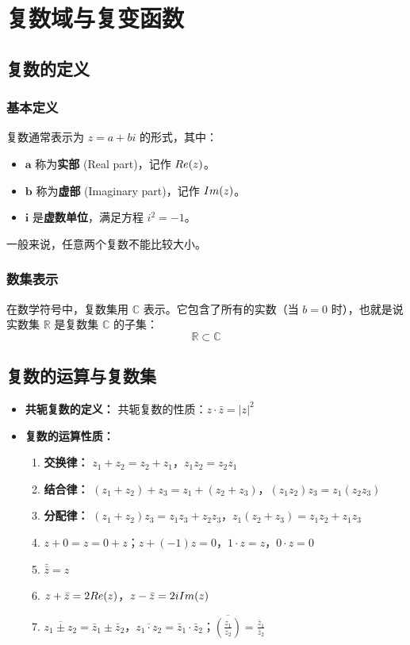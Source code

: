 \chapter{复数域与复变函数}

\section{复数的定义}
\subsection{基本定义}
复数通常表示为 $z = a + bi$ 的形式，其中：
\begin{itemize}
	\item $\boldsymbol{a}$ 称为\textbf{实部} (Real part)，记作 $Re(z)$。
	\item $\boldsymbol{b}$ 称为\textbf{虚部} (Imaginary part)，记作 $Im(z)$。
	\item $\boldsymbol{i}$ 是\textbf{虚数单位}，满足方程 $i^2 = -1$。
\end{itemize}

\begin{tcolorbox}[title=备注 (Remark), colframe=lightgray!60!black, colback=lightgray!10!white, sharp corners]
	一般来说，任意两个复数不能比较大小。
\end{tcolorbox}

\subsection{数集表示}
在数学符号中，复数集用 $\mathbb{C}$ 表示。它包含了所有的实数（当 $b=0$ 时），也就是说实数集 $\mathbb{R}$ 是复数集 $\mathbb{C}$ 的子集：
$$\mathbb{R} \subset \mathbb{C}$$

\section{复数的运算与复数集}
\begin{itemize}
	\item \textbf{共轭复数的定义：}
	共轭复数的性质：$z \cdot \bar{z} = |z|^2$
	\item \textbf{复数的运算性质：}
	\begin{enumerate}
		\item \textbf{交换律：} $z_1 + z_2 = z_2 + z_1$，$z_1 z_2 = z_2 z_1$
		\item \textbf{结合律：} $(z_1 + z_2) + z_3 = z_1 + (z_2 + z_3)$，$(z_1 z_2) z_3 = z_1 (z_2 z_3)$
		\item \textbf{分配律：} $(z_1 + z_2) z_3 = z_1 z_3 + z_2 z_3$，$z_1 (z_2 + z_3) = z_1 z_2 + z_1 z_3$
		\item $z + 0 = z = 0 + z$；$z + (-1)z = 0$，$1 \cdot z = z$，$0 \cdot z = 0$
		\item $\bar{\bar{z}} = z$
		\item $z + \bar{z} = 2 Re(z)$，$z - \bar{z} = 2i Im(z)$
		\item $\overline{z_1 \pm z_2} = \bar{z}_1 \pm \bar{z}_2$，$\overline{z_1 \cdot z_2} = \bar{z}_1 \cdot \bar{z}_2$；$\overline{\left(\frac{z_1}{z_2}\right)} = \frac{\bar{z}_1}{\bar{z}_2}$
	\end{enumerate}
\end{itemize}

